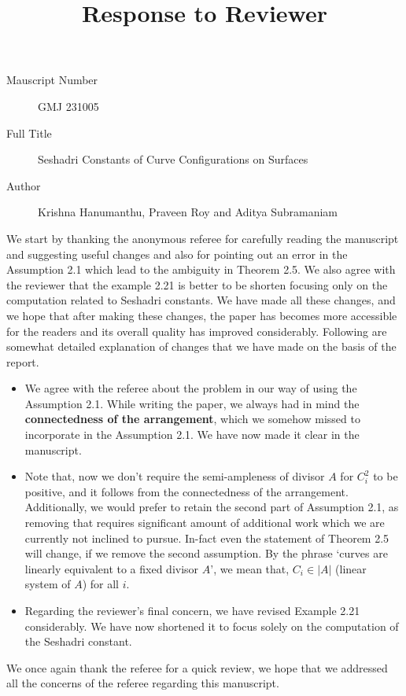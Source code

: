 \documentclass[12pt,twoside,reqno]{amsart}
\numberwithin{equation}{section}
\theoremstyle{definition}
\begin{document}
\title{Response to Reviewer}
\begin{description}
\item [Mauscript Number] GMJ 231005 \\
\item [Full Title] Seshadri Constants of Curve Configurations on Surfaces
\item [Author] Krishna Hanumanthu, Praveen Roy and Aditya Subramaniam
\end{description}

We start by thanking the anonymous referee for carefully reading the manuscript and suggesting 
useful changes and also for pointing out an error in the Assumption 2.1 which lead to the ambiguity in Theorem 2.5. We also agree with the reviewer that the example 2.21 is 
better to be shorten focusing only on the computation related to Seshadri constants. We have made all these changes, and we hope that after making these changes, the paper has becomes more accessible for the readers and its overall quality has improved considerably.  Following are somewhat detailed explanation of changes that we have made on the basis of the report. \\
\begin{itemize}
\item We agree with the referee about the problem in our way of using the Assumption 2.1. While writing the paper, we always had in mind the \textbf{connectedness of the arrangement}, 
which we somehow missed to incorporate in the Assumption 2.1. We have now made it clear in the manuscript. \\
\item Note that, now we don't require the semi-ampleness of divisor $A$ for $C_i^2$ to be positive, and it follows 
from the connectedness of the arrangement. Additionally, we would prefer to retain the second part of Assumption 2.1, as removing that requires 
significant amount of additional work which we are currently not inclined to pursue. In-fact even the statement of Theorem 2.5 will change, if we remove the second assumption. 
By the phrase `curves are linearly equivalent to a fixed divisor $A$', we mean that, $C_i \in |A|$ (linear system of $A$) for all $i$. \\
\item Regarding the reviewer's final concern, we have revised Example 2.21 considerably. We have now shortened it to focus solely on the computation of the Seshadri constant.
\end{itemize}


We once again thank the referee for a quick review, we hope that we addressed all the concerns of the referee regarding this manuscript.
\end{document}
